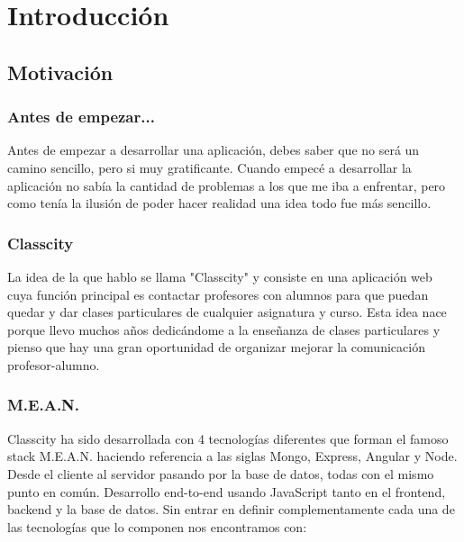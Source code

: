 \chapter{Introducción}

\section{Motivación}

\subsection{Antes de empezar...}

Antes de empezar a desarrollar una aplicación, debes saber que no será un camino sencillo, pero si muy gratificante. Cuando empecé a desarrollar la aplicación no sabía la cantidad de problemas a los que me iba a enfrentar, pero como tenía la ilusión de poder hacer realidad una idea todo fue más sencillo. 

\subsection{Classcity}

La idea de la que hablo se llama "Classcity" y consiste en una aplicación web cuya función principal es contactar profesores con alumnos para que puedan quedar y dar clases particulares de cualquier asignatura y curso. Esta idea nace porque llevo muchos años dedicándome a la enseñanza de clases particulares y pienso que hay una gran oportunidad de organizar mejorar la comunicación profesor-alumno. 

\subsection{M.E.A.N.}

Classcity ha sido desarrollada con 4 tecnologías diferentes que forman el famoso stack M.E.A.N. haciendo referencia a las siglas Mongo, Express, Angular y Node. Desde el cliente al servidor pasando por la base de datos, todas con el mismo punto en común. Desarrollo end-to-end usando JavaScript tanto en el frontend, backend y la base de datos. Sin entrar en definir complementamente cada una de las tecnologías que lo componen nos encontramos con:



